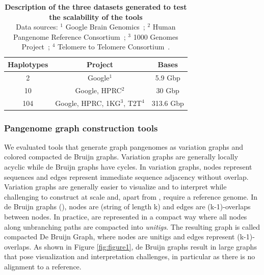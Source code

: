 \begin{table}
	\centering
	\setlength{\tabcolsep}{5pt} 
	\caption[Description of the three datasets generated to test the scalability of the tools.]{\textbf{Description of the three datasets generated to test the scalability of the tools}
		\\
		Data sources: 
		$^1$ Google Brain Genomics~\cite{google-assemblies}; $^2$ Human Pangenome Reference Consortium~\cite{HPRC-haplotypes}; $^3$ 1000 Genomes Project~\cite{HPRC-haplotypes}; $^4$ Telomere to Telomere Consortium~\cite{HPRC-haplotypes}.
		\label{tab:datasets}}
	\renewcommand{\arraystretch}{1.2}
	\begin{tabular}{|c c c|}
		\hline
		\centering
		Haplotypes & Project & Bases \\
		\hline
		2 & Google$^1$ & 5.9 Gbp\\
		10 & Google, HPRC$^2$ & 30 Gbp \\
		104 & Google, HPRC, 1KG$^3$, T2T$^4$ & 313.6 Gbp \\
		\hline
	\end{tabular}
\end{table}

\subsubsection*{\textbf{Pangenome graph construction tools}}
\label{sec:tools}

We evaluated tools that generate graph pangenomes as variation graphs and colored compacted de Bruijn graphs. Variation graphs are generally locally acyclic while de Bruijn graphs have cycles. In variation graphs, nodes represent sequences and edges represent immediate sequence adjacency without overlap. Variation graphs are generally easier to visualize and to interpret while challenging to construct at scale and, apart from \pggb, require a reference genome. In de Bruijn graphs (\dbg), nodes are \kmers (string of length k) and edges are (k-1)-overlaps between nodes. In practice, \dbgs are represented in a compact way where all nodes along unbranching paths are compacted into \emph{unitigs}. The resulting graph is called compacted De Bruijn Graph, where nodes are unitigs and edges represent (k-1)-overlaps. 
As shown in Figure \ref{fig:figure1}, de Bruijn graphs %
result in large graphs that pose visualization and interpretation challenges, in particular as there is no alignment to a reference.

